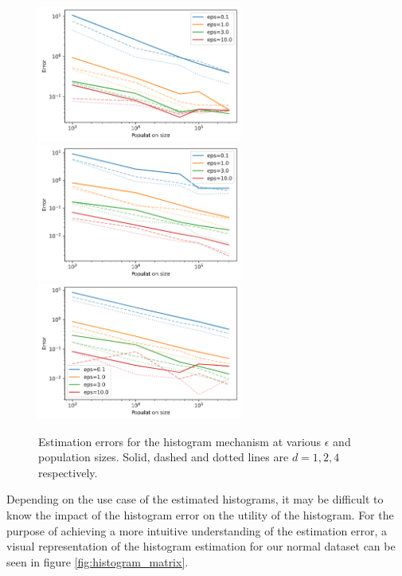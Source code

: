 \documentclass[12pt]{article}
\begin{document}
\begin{description}
    \begin{figure}
        \centering
            {\includegraphics[width=0.6\textwidth]{imgs/histogram_err_normal.png}}
            {\includegraphics[width=0.6\textwidth]{imgs/histogram_err_uniform.png}}
            {\includegraphics[width=0.6\textwidth]{imgs/histogram_err_constant.png}}
        \caption{Estimation errors for the histogram mechanism at various $\epsilon$ and population sizes. Solid, dashed and dotted lines are $d=1,2,4$ respectively.}
        \label{fig:histogram_errors}
    \end{figure}
    
    Depending on the use case of the estimated histograms, it may be difficult to know the impact of the histogram error on the utility of the histogram. For the purpose of achieving a more intuitive understanding of the estimation error, a visual representation of the histogram estimation for our normal dataset can be seen in figure \ref{fig:histogram_matrix}.
    

\end{description}
\end{document}
